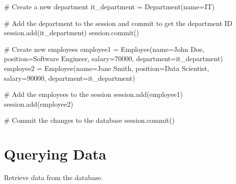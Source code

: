 \documentclass[
  letterpaper,
  DIV=11,
  numbers=noendperiod]{scrreprt}
\newenvironment{Shaded}{\begin{snugshade}}{\end{snugshade}}
\newcommand{\CommentTok}[1]{\textcolor[rgb]{0.37,0.37,0.37}{#1}}
\newcommand{\DecValTok}[1]{\textcolor[rgb]{0.68,0.00,0.00}{#1}}
\newcommand{\NormalTok}[1]{\textcolor[rgb]{0.00,0.23,0.31}{#1}}
\newcommand{\OperatorTok}[1]{\textcolor[rgb]{0.37,0.37,0.37}{#1}}
\newcommand{\StringTok}[1]{\textcolor[rgb]{0.13,0.47,0.30}{#1}}
\begin{document}
\begin{Shaded}
\begin{Highlighting}[]
\CommentTok{\# Create a new department}
\NormalTok{it\_department }\OperatorTok{=}\NormalTok{ Department(name}\OperatorTok{=}\StringTok{\textquotesingle{}IT\textquotesingle{}}\NormalTok{)}

\CommentTok{\# Add the department to the session and commit to get the department ID}
\NormalTok{session.add(it\_department)}
\NormalTok{session.commit()}

\CommentTok{\# Create new employees}
\NormalTok{employee1 }\OperatorTok{=}\NormalTok{ Employee(name}\OperatorTok{=}\StringTok{\textquotesingle{}John Doe\textquotesingle{}}\NormalTok{, position}\OperatorTok{=}\StringTok{\textquotesingle{}Software Engineer\textquotesingle{}}\NormalTok{, salary}\OperatorTok{=}\DecValTok{70000}\NormalTok{, department}\OperatorTok{=}\NormalTok{it\_department)}
\NormalTok{employee2 }\OperatorTok{=}\NormalTok{ Employee(name}\OperatorTok{=}\StringTok{\textquotesingle{}Jane Smith\textquotesingle{}}\NormalTok{, position}\OperatorTok{=}\StringTok{\textquotesingle{}Data Scientist\textquotesingle{}}\NormalTok{, salary}\OperatorTok{=}\DecValTok{90000}\NormalTok{, department}\OperatorTok{=}\NormalTok{it\_department)}

\CommentTok{\# Add the employees to the session}
\NormalTok{session.add(employee1)}
\NormalTok{session.add(employee2)}

\CommentTok{\# Commit the changes to the database}
\NormalTok{session.commit()}
\end{Highlighting}
\end{Shaded}

\section{Querying Data}\label{querying-data-1}

Retrieve data from the database.
\end{document}
